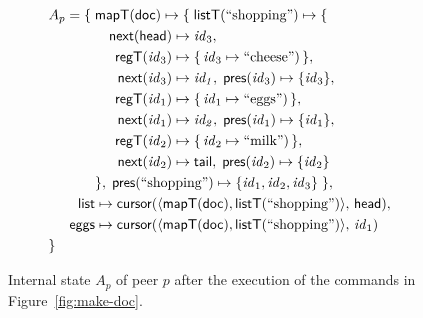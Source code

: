 \documentclass[a4paper,twocolumn,10pt]{article}
\newcommand{\multialign}[2]{%
  \multispan{#1}\mbox{$\displaystyle{}#2$}%
}
\begin{document}
\begin{figure}
\centering \begin{alignat*}{3}
& \multialign{5}{A_p = \{\; \mathsf{mapT}(\mathsf{doc}) \mapsto \{\;
    \mathsf{listT}(\text{``shopping''}) \mapsto \{ } \\
&&&& \mathsf{next}(\mathsf{head}) & \mapsto \mathit{id}_3, \\
&&&& \mathsf{regT}(\mathit{id}_3) & \mapsto \{\,\mathit{id}_3 \mapsto \text{``cheese''})\,\}, \\
&&&& \mathsf{next}(\mathit{id}_3) & \mapsto \mathit{id_1},\; \mathsf{pres}(\mathit{id}_3) \mapsto \{\mathit{id}_3\}, \\
&&&& \mathsf{regT}(\mathit{id}_1) & \mapsto \{\,\mathit{id}_1 \mapsto \text{``eggs''})\,\}, \\
&&&& \mathsf{next}(\mathit{id}_1) & \mapsto \mathit{id_2},\; \mathsf{pres}(\mathit{id}_1) \mapsto \{\mathit{id}_1\}, \\
&&&& \mathsf{regT}(\mathit{id}_2) & \mapsto \{\,\mathit{id}_2 \mapsto \text{``milk''})\,\}, \\
&&&& \mathsf{next}(\mathit{id}_2) & \mapsto \mathsf{tail},\; \mathsf{pres}(\mathit{id}_2) \mapsto \{\mathit{id}_2\} \\
&&& \multialign{3}{\},\;
    \mathsf{pres}(\text{``shopping''}) \mapsto \{\mathit{id}_1, \mathit{id}_2, \mathit{id}_3\} \;\},} \\
&& \mathsf{list} & \multialign{3}{\mapsto \mathsf{cursor}(\langle \mathsf{mapT}(\mathsf{doc}),%
    \mathsf{listT}(\text{``shopping''})\rangle,\, \mathsf{head}),} \\
&& \mathsf{eggs} & \multialign{3}{\mapsto \mathsf{cursor}(\langle \mathsf{mapT}(\mathsf{doc}),%
    \mathsf{listT}(\text{``shopping''})\rangle,\, \mathit{id}_1)} \\
& \}
\end{alignat*}
\caption{Internal state $A_p$ of peer $p$ after the execution of the commands in Figure~\ref{fig:make-doc}.}\label{fig:state-example}
\end{figure}
\end{document}
